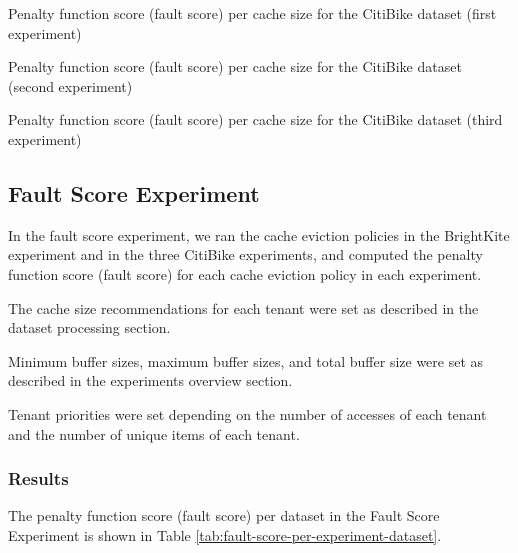 \begin{table}[ht]
    \centering
    \small
    \caption{Penalty function score (fault score) per cache size for the CitiBike dataset (first experiment)}
    \label{tab:fault-score-per-buffer-size-citibike}
\end{table}

\begin{table}[ht]
    \centering
    \small
    \caption{Penalty function score (fault score) per cache size for the CitiBike dataset (second experiment)}
    \label{tab:fault-score-per-buffer-size-citibike-2}
\end{table}

\begin{table}[ht]
    \centering
    \small
    \caption{Penalty function score (fault score) per cache size for the CitiBike dataset (third experiment)}
    \label{tab:fault-score-per-buffer-size-citibike-3}
\end{table}

\subsection{Fault Score Experiment}

In the fault score experiment, we ran the cache eviction policies in the BrightKite experiment 
and in the three CitiBike experiments, and computed the penalty function score (fault score) 
for each cache eviction policy in each experiment.

The cache size recommendations for each tenant were set as described in the dataset processing 
section.

Minimum buffer sizes, maximum buffer sizes, and total buffer size were set as described in 
the experiments overview section.

Tenant priorities were set depending on the number of accesses of each tenant and the number of
unique items of each tenant.

\subsubsection*{Results}

The penalty function score (fault score) per dataset in the Fault Score Experiment is shown
in Table \ref{tab:fault-score-per-experiment-dataset}.

